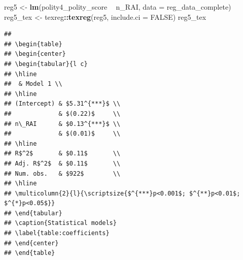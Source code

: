 \documentclass[
]{article}
\newenvironment{Shaded}{\begin{snugshade}}{\end{snugshade}}
\newcommand{\DataTypeTok}[1]{\textcolor[rgb]{0.13,0.29,0.53}{#1}}
\newcommand{\KeywordTok}[1]{\textcolor[rgb]{0.13,0.29,0.53}{\textbf{#1}}}
\newcommand{\NormalTok}[1]{#1}
\newcommand{\OperatorTok}[1]{\textcolor[rgb]{0.81,0.36,0.00}{\textbf{#1}}}
\newcommand{\OtherTok}[1]{\textcolor[rgb]{0.56,0.35,0.01}{#1}}
\newcommand{\StringTok}[1]{\textcolor[rgb]{0.31,0.60,0.02}{#1}}
\begin{document}
\begin{Shaded}
\begin{Highlighting}[]
\NormalTok{reg5 <-}\StringTok{ }\KeywordTok{lm}\NormalTok{(polity4_polity_score }\OperatorTok{~}\StringTok{ }\NormalTok{n_RAI, }\DataTypeTok{data =}\NormalTok{ reg_data_complete)}
\NormalTok{reg5_tex <-}\StringTok{ }\NormalTok{texreg}\OperatorTok{::}\KeywordTok{texreg}\NormalTok{(reg5, }\DataTypeTok{include.ci =} \OtherTok{FALSE}\NormalTok{)}
\NormalTok{reg5_tex}
\end{Highlighting}
\end{Shaded}

\begin{verbatim}
## 
## \begin{table}
## \begin{center}
## \begin{tabular}{l c}
## \hline
##  & Model 1 \\
## \hline
## (Intercept) & $5.31^{***}$ \\
##             & $(0.22)$     \\
## n\_RAI      & $0.13^{***}$ \\
##             & $(0.01)$     \\
## \hline
## R$^2$       & $0.11$       \\
## Adj. R$^2$  & $0.11$       \\
## Num. obs.   & $922$        \\
## \hline
## \multicolumn{2}{l}{\scriptsize{$^{***}p<0.001$; $^{**}p<0.01$; $^{*}p<0.05$}}
## \end{tabular}
## \caption{Statistical models}
## \label{table:coefficients}
## \end{center}
## \end{table}
\end{verbatim}

\begin{Shaded}
\end{Shaded}
\end{document}

